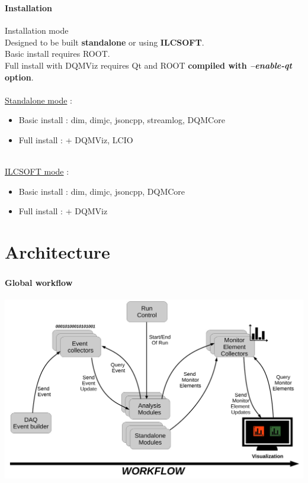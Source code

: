\documentclass[8pt]{beamer}
\begin{document}
  
  \begin{frame}
    \frametitle{\secname}
    \framesubtitle{Installation}
    
    \begin{block}{Installation mode}
      ~ \\
      Designed to be built \textbf{standalone} or using \textbf{ILCSOFT}. \\
      Basic install requires ROOT. \\
      Full install with DQMViz requires Qt and ROOT \textbf{compiled with \textit{--enable-qt} option}. \\
      ~ \\
      \underline{Standalone mode} :
      \begin{itemize}
        \item Basic install : dim, dimjc, jsoncpp, streamlog, DQMCore
        \item Full install : + DQMViz, LCIO
      \end{itemize}
      ~ \\
      \underline{ILCSOFT mode} :
      \begin{itemize}
        \item Basic install : dim, dimjc, jsoncpp, DQMCore
        \item Full install : + DQMViz
      \end{itemize}
    \end{block}
  \end{frame}
  
  
  
  \section{Architecture}
  
  \begin{frame}
    \frametitle{\secname}
    \framesubtitle{Global workflow}
    
    \begin{center}
      \includegraphics[width=\textwidth]{figs/DQM4HEP_workflow.pdf}        
    \end{center}
  
  \end{frame}
  
\end{document}
